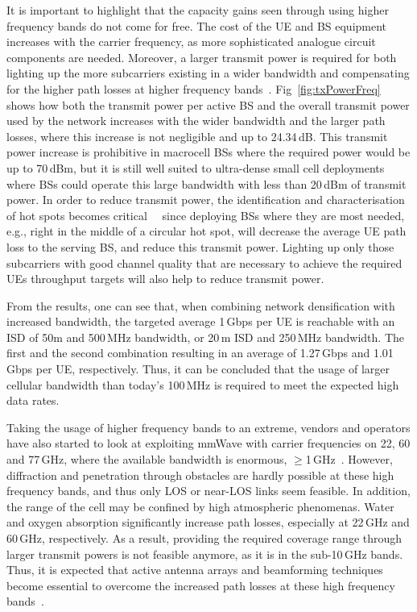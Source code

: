 \documentclass{IEEEtran}
\begin{document}
It is important to highlight that the capacity gains seen through using higher frequency bands do not come for free.
The cost of the \ac{UE} and \ac{BS} equipment increases with the carrier frequency,
as more sophisticated analogue circuit components are needed.
Moreover, a larger transmit power is required for both lighting up the more subcarriers existing in a wider bandwidth
and compensating for the higher path losses at higher frequency bands~\cite{6472194}.
Fig~\ref{fig:txPowerFreq} shows how both the transmit power per active \ac{BS} and the overall transmit power used by the network increases with the wider bandwidth and the larger path losses,
where this increase is not negligible and up to 24.34\,dB.
This transmit power increase is prohibitive in macrocell \acp{BS} where the required power would be up to 70\,dBm,
but it is still well suited to ultra-dense small cell deployments
where \acp{BS} could operate this large bandwidth with less than 20\,dBm of transmit power.
In order to reduce transmit power,
the identification and characterisation of hot spots becomes critical~\cite{1458284}~\cite{KlessigTrafficModelling}
since deploying \acp{BS} where they are most needed,
e.g., right in the middle of a circular hot spot,
will decrease the average \ac{UE} path loss to the serving \ac{BS},
and reduce this transmit power.
Lighting up only those subcarriers with good channel quality that are necessary to achieve the required \acp{UE} throughput targets will also help to reduce transmit power.


From the results,
one can see that, when combining network densification with increased bandwidth, the targeted average 1\,Gbps per \ac{UE} is reachable with an \ac{ISD} of 50m and 500\,MHz bandwidth,
or 20\,m \ac{ISD} and 250\,MHz bandwidth.
The first and the second combination resulting in an average of 1.27\,Gbps and 1.01\,Gbps per \ac{UE},
respectively.
Thus, it can be concluded that the usage of larger cellular bandwidth than today's 100\,MHz is required
to meet the expected high data rates.

Taking the usage of higher frequency bands to an extreme,
vendors and operators have also started to look at exploiting mmWave with carrier frequencies on 22, 60 and 77\,GHz,
where the available bandwidth is enormous, $\geq$1\,GHz~\cite{5783993}.
However, diffraction and penetration through obstacles are hardly possible at these high frequency bands,
and thus only \ac{LOS} or near-\ac{LOS} links seem feasible.
In addition, the range of the cell may be confined by high atmospheric phenomenas.
Water and oxygen absorption significantly increase path losses,
especially at 22\,GHz and 60\,GHz, respectively.
As a result, providing the required coverage range through larger transmit powers is not feasible anymore,
as it is in the sub-10\,GHz bands.
Thus, it is expected that active antenna arrays and beamforming techniques
become essential to overcome the increased path losses at these high frequency bands~\cite{6736761}.
\end{document}

